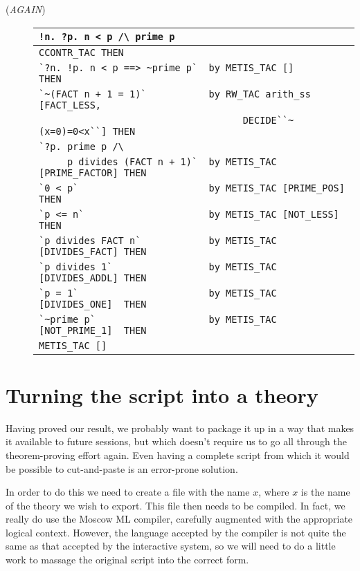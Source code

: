 \begin{description}
\item [\small{({\it AGAIN\/})}]
\begin{tabular}[t]{l}
\verb+!n. ?p. n < p /\ prime p+ \\ \hline
\verb|CCONTR_TAC THEN | \\
\verb|`?n. !p. n < p ==> ~prime p`  by METIS_TAC []             THEN| \\
\verb|`~(FACT n + 1 = 1)`           by RW_TAC arith_ss  [FACT_LESS,| \\
\verb|                                    DECIDE``~(x=0)=0<x``] THEN| \\
\verb|`?p. prime p /\  | \\
\verb|     p divides (FACT n + 1)`  by METIS_TAC [PRIME_FACTOR] THEN| \\
\verb|`0 < p`                       by METIS_TAC [PRIME_POS]    THEN| \\
\verb|`p <= n`                      by METIS_TAC [NOT_LESS]     THEN| \\
\verb|`p divides FACT n`            by METIS_TAC [DIVIDES_FACT] THEN| \\
\verb|`p divides 1`                 by METIS_TAC [DIVIDES_ADDL] THEN| \\
\verb|`p = 1`                       by METIS_TAC [DIVIDES_ONE]  THEN| \\
\verb|`~prime p`                    by METIS_TAC [NOT_PRIME_1]  THEN| \\
\verb|METIS_TAC []| \\
\end{tabular}
\end{description}

\section{Turning the script into a theory}
\label{sec:script-to-theory}

Having proved our result, we probably want to package it up in a way
that makes it available to future sessions, but which doesn't require
us to go all through the theorem-proving effort again.  Even having a
complete script from which it would be possible to cut-and-paste is an
error-prone solution.

In order to do this we need to create a file with the name
$x$, where $x$ is the name of the theory we wish to
export.  This file then needs to be compiled.  In fact, we really do
use the Moscow ML compiler, carefully augmented with the appropriate
logical context.  However, the language accepted by the compiler is
not quite the same as that accepted by the interactive system, so we
will need to do a little work to massage the original script into the
correct form.


